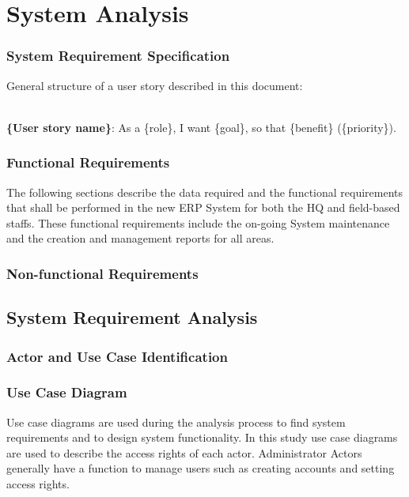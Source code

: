 \chapter{System Analysis}

\subsection{System Requirement Specification}

General structure of a user story described in this document: 
\\ \\
\begin{normalsize}
\textbf{\{User story name\}}: As a \{role\}, I want \{goal\}, so that \{benefit\} (\{priority\}).
\end{normalsize}

\subsection{Functional Requirements}
The following sections describe the data required and the functional requirements that shall be performed in the new ERP System for both the HQ and field-based staffs.  These functional requirements include the on-going System maintenance and the creation and management reports for all areas.

\subsection{Non-functional Requirements}

\section{System Requirement Analysis}

\subsection{Actor and Use Case Identification}

\subsection{Use Case Diagram}

Use case diagrams are used during the analysis
process to find system requirements and to design
system functionality. In this study use case
diagrams are used to describe the access rights of
each actor. Administrator Actors generally have a
function to manage users such as creating accounts
and setting access rights.

